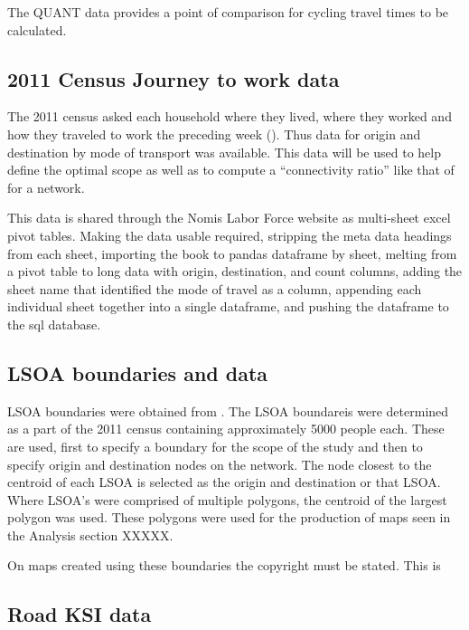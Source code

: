 The QUANT data provides a point of comparison for cycling travel times to be calculated. 

\subsection{2011 Census Journey to work data}

The 2011 census asked each household where they lived, where they worked and how they traveled to work the preceding week (\cite{jtw}). Thus data for origin and destination by mode of transport was available. This data will be used to help define the optimal scope as well as to compute a ``connectivity ratio'' like that of \cite{furth2012low} for a network. 

This data is shared through the Nomis Labor Force website as multi-sheet excel pivot tables. Making the data usable required, stripping the meta data headings from each sheet, importing the book to pandas dataframe by sheet, melting from a pivot table to long data with origin, destination, and count columns, adding the sheet name that identified the mode of travel as a column, appending each individual sheet together into a single dataframe, and pushing the dataframe to the sql database. 

\subsection{LSOA boundaries and data}
	
LSOA boundaries were obtained from  \cite{lsoageoms}. The LSOA boundareis were determined as a part of the 2011 census containing approximately 5000 people each. These are used, first to specify a boundary for the scope of the study and then to specify origin and destination nodes on the network. The node closest to the centroid of each LSOA is selected as the origin and destination or that LSOA. Where LSOA's were comprised of multiple polygons, the centroid of the largest polygon was used. These polygons were used for the production of maps seen in the Analysis section XXXXX. 

On maps created using these boundaries the copyright must be stated. This is
	
\subsection{Road KSI data}

